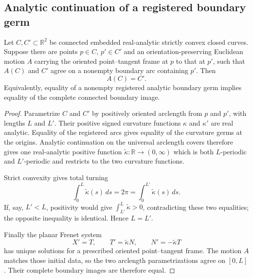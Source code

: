 \subsection{Analytic continuation of a registered boundary germ}

\begin{lemma}
\label{lem:v23-analytic-germ-globalization}
Let \(C,C'\subset\mathbb R^2\) be connected embedded real-analytic strictly
convex closed curves.  Suppose there are points \(p\in C\), \(p'\in C'\) and
an orientation-preserving Euclidean motion \(A\) carrying the oriented
point--tangent frame at \(p\) to that at \(p'\), such that \(A(C)\) and
\(C'\) agree on a nonempty boundary arc containing \(p'\).  Then
\[
                              A(C)=C'.
\]
Equivalently, equality of a nonempty registered analytic boundary germ implies
equality of the complete connected boundary image.
\end{lemma}

\begin{proof}
Parametrize \(C\) and \(C'\) by positively oriented arclength from \(p\) and
\(p'\), with lengths \(L\) and \(L'\).  Their positive signed curvature
functions \(\kappa\) and \(\kappa'\) are real analytic.  Equality of the
registered arcs gives equality of the curvature germs at the origins.
Analytic continuation on the universal arclength covers therefore gives one
real-analytic positive function \(\widetilde\kappa:\mathbb R\to(0,\infty)\)
which is both \(L\)-periodic and \(L'\)-periodic and restricts to the two
curvature functions.

Strict convexity gives total turning
\[
 \int_0^L\widetilde\kappa(s)\,ds=2\pi
 =\int_0^{L'}\widetilde\kappa(s)\,ds.
\]
If, say, \(L'<L\), positivity would give
\(\int_{L'}^L\widetilde\kappa>0\), contradicting these two equalities; the
opposite inequality is identical.  Hence \(L=L'\).

Finally the planar Frenet system
\[
 X'=T,\qquad T'=\widetilde\kappa N,\qquad
 N'=-\widetilde\kappa T
\]
has unique solutions for a prescribed oriented point--tangent frame.  The
motion \(A\) matches those initial data, so the two arclength parametrizations
agree on \([0,L]\).  Their complete boundary images are therefore equal.
\end{proof}
